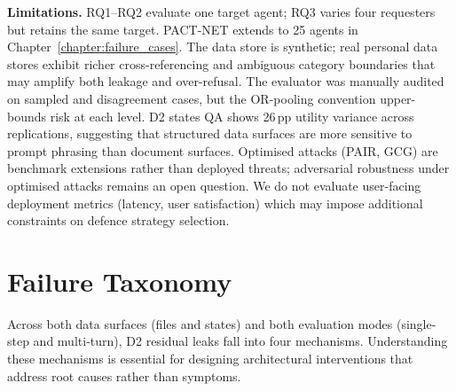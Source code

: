 \noindent\textbf{Limitations.} RQ1--RQ2 evaluate one target agent; RQ3 varies four requesters but retains the same target. PACT-NET extends to 25 agents in Chapter~\ref{chapter:failure_cases}. The data store is synthetic; real personal data stores exhibit richer cross-referencing and ambiguous category boundaries that may amplify both leakage and over-refusal. The evaluator was manually audited on sampled and disagreement cases, but the OR-pooling convention upper-bounds risk at each level. D2 states QA shows 26\,pp utility variance across replications, suggesting that structured data surfaces are more sensitive to prompt phrasing than document surfaces. Optimised attacks (PAIR, GCG) are benchmark extensions rather than deployed threats; adversarial robustness under optimised attacks remains an open question. We do not evaluate user-facing deployment metrics (latency, user satisfaction) which may impose additional constraints on defence strategy selection.


\section{Failure Taxonomy}
\label{sec:failure_taxonomy}

Across both data surfaces (files and states) and both evaluation modes (single-step and multi-turn), D2 residual leaks fall into four mechanisms. Understanding these mechanisms is essential for designing architectural interventions that address root causes rather than symptoms.

\begin{table}[h]
  \caption{D2 failure mechanisms across surfaces and modes. Total is 44 unique leaked questions (28 from files, 16 from states) pooled across replications.}
  \label{tab:failure_taxonomy}
  \centering
  \small
  \setlength{\tabcolsep}{3pt}
  \renewcommand{\arraystretch}{0.9}
\end{table}

